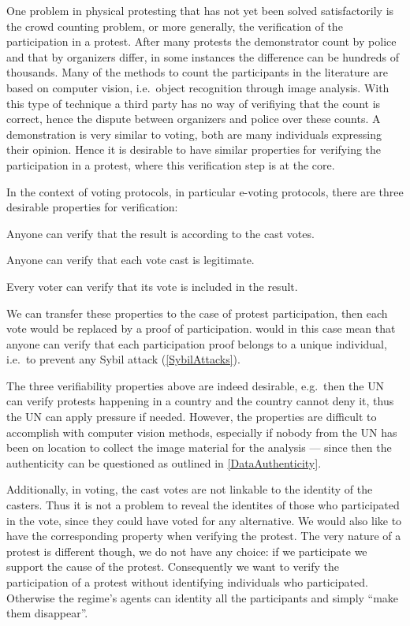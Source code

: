 One problem in physical protesting that has not yet been solved satisfactorily 
is the crowd counting problem, or more generally, the verification of the 
participation in a protest.
After many protests the demonstrator count by police and that by organizers 
differ, in some instances the difference can be hundreds of thousands.
Many of the methods to count the participants in the literature are based on 
computer vision, i.e.\ object recognition through image analysis.
With this type of technique a third party has no way of verifiying that the 
count is correct, hence the dispute between organizers and police over these 
counts.
A demonstration is very similar to voting, both are many individuals expressing 
their opinion.
Hence it is desirable to have similar properties for verifying the 
participation in a protest, where this verification step is at the core.

In the context of voting protocols, in particular e-voting protocols, there are 
three desirable properties for verification:
\begin{properties}
\item\label{UniversalVerif} Anyone can verify that the result is according to 
  the cast votes.
\item\label{EligibilityVerif} Anyone can verify that each vote cast is 
  legitimate.
\item\label{IndividualVerif} Every voter can verify that its vote is included 
  in the result.
\end{properties}
We can transfer these properties to the case of protest participation, then 
each vote would be replaced by a proof of participation.
 would in this case mean that anyone can verify that 
each participation proof belongs to a unique individual, i.e.\ to prevent any 
Sybil attack (\cref{SybilAttacks}).

The three verifiability properties above are indeed desirable, e.g.\ then the 
\ac{UN} can verify protests happening in a country and the country cannot deny 
it, thus the \ac{UN} can apply pressure if needed.
However, the properties are difficult to accomplish with computer vision 
methods, especially if nobody from the \ac{UN} has been on location to collect 
the image material for the analysis --- since then the authenticity can be 
questioned as outlined in \cref{DataAuthenticity}.

Additionally, in voting, the cast votes are not linkable to the identity of the 
casters.
Thus it is not a problem to reveal the identites of those who participated in 
the vote, since they could have voted for any alternative.
We would also like to have the corresponding property when verifying the 
protest.
The very nature of a protest is different though, we do not have any choice: if 
we participate we support the cause of the protest. %
Consequently we want to verify the participation of a protest without 
identifying individuals who participated.
Otherwise the regime's agents can identity all the participants and simply 
\enquote{make them disappear}. %

